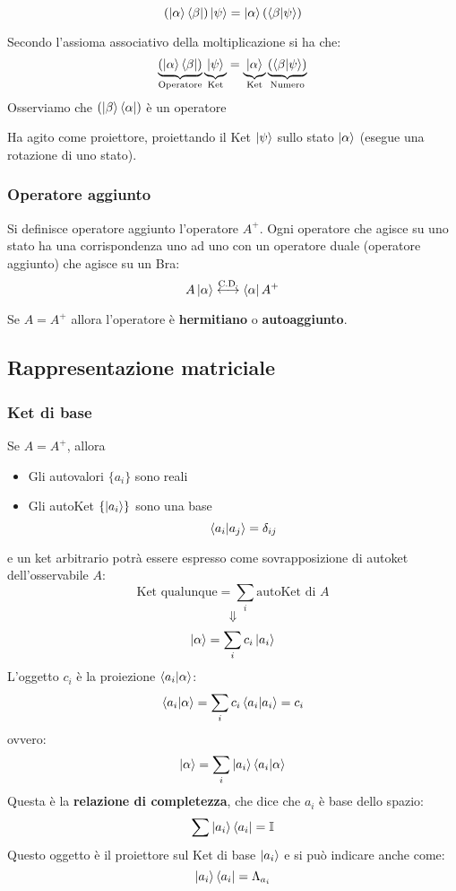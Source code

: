 \documentclass[a4paper]{article}
\begin{document}
\vspace{1em}
\noindent
\begin{theorem}
  \[
    \left( \ket{\alpha} \bra{\beta} \right)\ket{\psi} =
    \ket{\alpha} \left( \bra{\beta} \ket{\psi} \right)
  \] 
\end{theorem}
Secondo l'assioma associativo della moltiplicazione si ha che:
\[
  \underbrace{\left( \ket{\alpha} \bra{\beta} \right)}_{\text{Operatore}}
  \underbrace{\ket{\psi}}_{\text{Ket}} =
  \underbrace{\ket{\alpha}}_{\text{Ket}} 
  \underbrace{\left( \bra{\beta} \ket{\psi} \right)}_{\text{Numero}}
\] 
Osserviamo che \( \left( \ket{\beta} \bra{\alpha} \right)  \) è un operatore

Ha agito come proiettore, proiettando il Ket \( \ket{\psi} \) sullo stato \( \ket{\alpha} \)
(esegue una rotazione di uno stato).

\subsubsection{Operatore aggiunto}
\begin{definition}
  Si definisce operatore aggiunto l'operatore \( A^+ \).
  Ogni operatore che agisce su uno stato ha una corrispondenza uno ad uno con un operatore
  duale (operatore aggiunto) che agisce su un Bra:
  \[
    A \ket{\alpha} \stackrel{\text{C.D.}}{\longleftrightarrow} \bra{\alpha}A^+
  \] 

  \vspace{1em}
  \noindent
  Se \( A = A^+ \) allora l'operatore è \textbf{hermitiano} o \textbf{autoaggiunto}.
\end{definition}

\subsection{Rappresentazione matriciale}
\subsubsection{Ket di base}
Se \( A = A^+ \), allora
\begin{itemize}
  \item Gli autovalori \( \{a_i\} \) sono reali
  \item Gli autoKet \( \{\ket{a_i}\}  \) sono una base
    \[
      \braket{a_i}{a_j} = \delta_{ij}
    \] 
\end{itemize}
e un ket arbitrario potrà essere espresso come sovrapposizione di autoket dell'osservabile
\( A \):
\[
  \text{Ket qualunque} = \sum_i \text{autoKet di } A
\] 
\[
\Downarrow
\] 
\[
  \ket{\alpha} = \sum_i c_i \ket{a_i}
\] 
L'oggetto \( c_i \) è la proiezione \( \braket{a_i}{\alpha} \):
\[
  \braket{a_i}{\alpha} = \sum_i c_i \braket{a_i}{a_i} = c_i
\] 
ovvero:
\[
  \ket{\alpha} = \sum_i \ket{a_i} \braket{a_i}{\alpha}
\] 
Questa è la \textbf{relazione di completezza}, che dice che \( a_i \) è base dello spazio:
\[
  \sum \ket{a_i} \bra{a_i} = \mathbb{I}
\] 
Questo oggetto è il proiettore sul Ket di base \( \ket{a_i} \) e si può indicare anche
come:
\[
  \ket{a_i} \bra{a_i} = \Lambda_{a_i}
\] 
\end{document}
